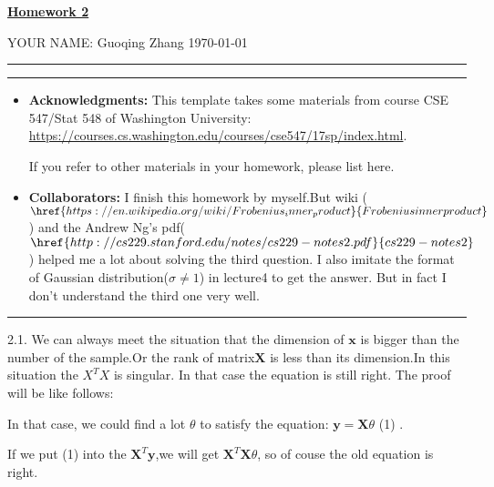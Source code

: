 \documentclass[a4paper]{article}
\begin{document}
\courseheader



\setcounter{hwcnt}{1} %

\begin{center}
  \underline{\bf Homework 2 } \\
\end{center}
\begin{flushleft}
  YOUR NAME: Guoqing Zhang\hfill
  \today
\end{flushleft}
\hrule

\vspace{2em}

\flushleft
\rule{\textwidth}{1pt}
\begin{itemize}
\item {\bf Acknowledgments: \/} 
  This template takes some materials from course CSE 547/Stat 548 of Washington University: \small{\url{https://courses.cs.washington.edu/courses/cse547/17sp/index.html}}.

  If you refer to other materials in your homework, please list here.
\item {\bf Collaborators: \/}
  I finish this homework by myself.But wiki ($\href{https://en.wikipedia.org/wiki/Frobenius_inner_product}{Frobenius inner product}$) and the Andrew Ng's pdf($\href{http://cs229.stanford.edu/notes/cs229-notes2.pdf}{cs229-notes2}$) helped me a lot about solving the third question. I also imitate the format of Gaussian distribution($\sigma \neq 1$) in lecture4 to get the answer. But in fact I don't understand the third one very well. 
\end{itemize}
\rule{\textwidth}{1pt}

\vspace{2em}
2.1. We can always meet the situation that the dimension of $\mathbf{x}$ is bigger than the number of the sample.Or the rank of matrix$\mathbf{X}$ is less than its dimension.In this situation the $X^TX$ is singular. In that case the equation is still right. The proof will be like follows:

In that case, we could find a lot $\theta$ to satisfy the equation:
$\mathbf{y} = \mathbf{X}\theta $ (1) .

If we put (1) into the $\mathbf{X}^T \mathbf{y}$,we will get $\mathbf{X}^T\mathbf{X} \theta $, so of couse the old equation is right.
\end{document}
